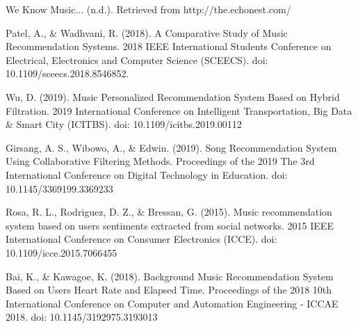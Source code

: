 \documentclass[letterpaper, 10 pt, conference]{ieeeconf}
\begin{document}

\begin{thebibliography}{99}

 We Know Music... (n.d.). Retrieved from http://the.echonest.com/

 Patel, A., \& Wadhvani, R. (2018). A Comparative Study of Music Recommendation Systems. 2018 IEEE International Students Conference on Electrical, Electronics and Computer Science (SCEECS). doi: 10.1109/sceecs.2018.8546852.

 Wu, D. (2019). Music Personalized Recommendation System Based on Hybrid Filtration. 2019 International Conference on Intelligent Transportation, Big Data \& Smart City (ICITBS). doi: 10.1109/icitbs.2019.00112

 Girsang, A. S., Wibowo, A., \& Edwin. (2019). Song Recommendation System Using Collaborative Filtering Methods. Proceedings of the 2019 The 3rd International Conference on Digital Technology in Education. doi: 10.1145/3369199.3369233

 Rosa, R. L., Rodriguez, D. Z., \& Bressan, G. (2015). Music recommendation system based on users sentiments extracted from social networks. 2015 IEEE International Conference on Consumer Electronics (ICCE). doi: 10.1109/icce.2015.7066455

 Bai, K., \& Kawagoe, K. (2018). Background Music Recommendation System Based on Users Heart Rate and Elapsed Time. Proceedings of the 2018 10th International Conference on Computer and Automation Engineering - ICCAE 2018. doi: 10.1145/3192975.3193013

\end{thebibliography}
\end{document}
